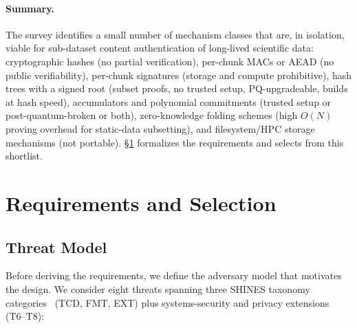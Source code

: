 \documentclass[11pt]{article}
\begin{document}
\paragraph{Summary.}
The survey identifies a small number of mechanism classes that are, in
isolation, viable for sub-dataset content authentication of long-lived
scientific data: cryptographic hashes (no partial verification), per-chunk
MACs or AEAD (no public verifiability), per-chunk signatures (storage and
compute prohibitive), hash trees with a signed root (subset proofs, no trusted
setup, PQ-upgradeable, builds at hash speed), accumulators and polynomial
commitments (trusted setup or post-quantum-broken or both), zero-knowledge
folding schemes (high $O(N)$ proving overhead for static-data subsetting),
and filesystem/HPC storage mechanisms (not portable). \S\ref{sec:selection}
formalizes the requirements and selects from this shortlist.

\section{Requirements and Selection}
\label{sec:selection}

\subsection{Threat Model}
\label{sec:threat}

Before deriving the requirements, we define the adversary model
that motivates the design. We consider eight threats spanning three SHINES
taxonomy categories~\cite{shines} (TCD, FMT, EXT) plus systems-security
and privacy extensions (T6--T8):
\end{document}

